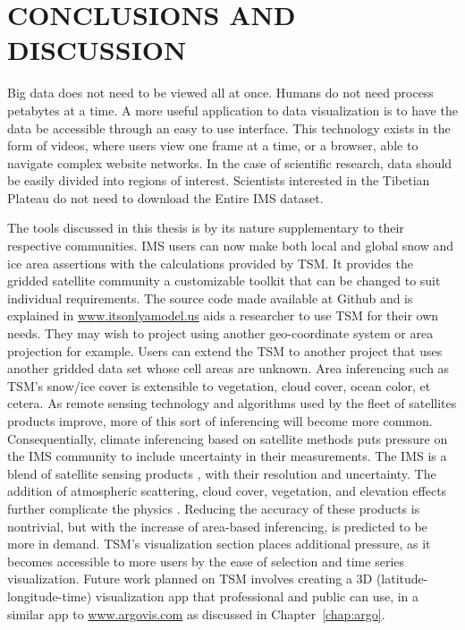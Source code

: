 \chapter{CONCLUSIONS AND DISCUSSION}
\label{chap:conclusion}

Big data does not need to be viewed all at once. Humans do not need process petabytes at a time. A more useful application to data visualization is to have the data be accessible through an easy to use interface. This technology exists in the form of videos, where users view one frame at a time, or a browser, able to navigate complex website networks. In the case of scientific research, data should be easily divided into regions of interest. Scientists interested in the Tibetian Plateau do not need to download the Entire IMS dataset.

The tools discussed in this thesis is by its nature supplementary to their respective communities. IMS users can now make both local and global snow and ice area assertions with the calculations provided by TSM. It provides the gridded satellite community a customizable toolkit that can be changed to suit individual requirements. The source code made available at Github \cite{git_proj} and is explained in \url{www.itsonlyamodel.us} \cite{tibet_snow_man} aids a researcher to use TSM for their own needs. They may wish to project using another geo-coordinate system or area projection for example. Users can extend the TSM to another project that uses another gridded data set whose cell areas are unknown. Area inferencing such as TSM's snow/ice cover is extensible to vegetation, cloud cover, ocean color, et cetera. As remote sensing technology and algorithms used by the fleet of satellites products improve, more of this sort of inferencing will become more common. Consequentially, climate inferencing based on satellite methods puts pressure on the IMS community to include uncertainty in their measurements. The IMS is a blend of satellite sensing products \cite{nat_ice}, with their resolution and uncertainty. The addition of atmospheric scattering, cloud cover, vegetation, and elevation effects further complicate the physics \cite{basist}. Reducing the accuracy of these products is nontrivial, but with the increase of area-based inferencing, is predicted to be more in demand. TSM's visualization section places additional pressure, as it becomes accessible to more users by the ease of selection and time series visualization. Future work planned on TSM involves creating a 3D (latitude-longitude-time) visualization app that professional and public can use, in a similar app to \url{www.argovis.com} as discussed in Chapter~\ref{chap:argo}.


